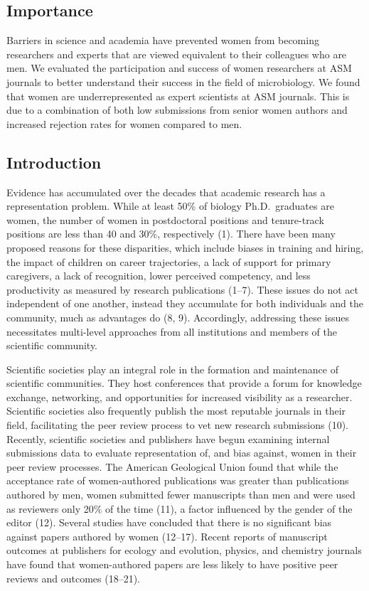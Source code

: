 \documentclass[11pt,]{article}
\begin{document}
\subsection{Importance}\label{importance}

Barriers in science and academia have prevented women from becoming
researchers and experts that are viewed equivalent to their colleagues
who are men. We evaluated the participation and success of women
researchers at ASM journals to better understand their success in the
field of microbiology. We found that women are underrepresented as
expert scientists at ASM journals. This is due to a combination of both
low submissions from senior women authors and increased rejection rates
for women compared to men.

\subsection{Introduction}\label{introduction}

Evidence has accumulated over the decades that academic research has a
representation problem. While at least 50\% of biology Ph.D.~graduates
are women, the number of women in postdoctoral positions and
tenure-track positions are less than 40 and 30\%, respectively (1).
There have been many proposed reasons for these disparities, which
include biases in training and hiring, the impact of children on career
trajectories, a lack of support for primary caregivers, a lack of
recognition, lower perceived competency, and less productivity as
measured by research publications (1--7). These issues do not act
independent of one another, instead they accumulate for both individuals
and the community, much as advantages do (8, 9). Accordingly, addressing
these issues necessitates multi-level approaches from all institutions
and members of the scientific community.

Scientific societies play an integral role in the formation and
maintenance of scientific communities. They host conferences that
provide a forum for knowledge exchange, networking, and opportunities
for increased visibility as a researcher. Scientific societies also
frequently publish the most reputable journals in their field,
facilitating the peer review process to vet new research submissions
(10). Recently, scientific societies and publishers have begun examining
internal submissions data to evaluate representation of, and bias
against, women in their peer review processes. The American Geological
Union found that while the acceptance rate of women-authored
publications was greater than publications authored by men, women
submitted fewer manuscripts than men and were used as reviewers only
20\% of the time (11), a factor influenced by the gender of the editor
(12). Several studies have concluded that there is no significant bias
against papers authored by women (12--17). Recent reports of manuscript
outcomes at publishers for ecology and evolution, physics, and chemistry
journals have found that women-authored papers are less likely to have
positive peer reviews and outcomes (18--21).
\end{document}
